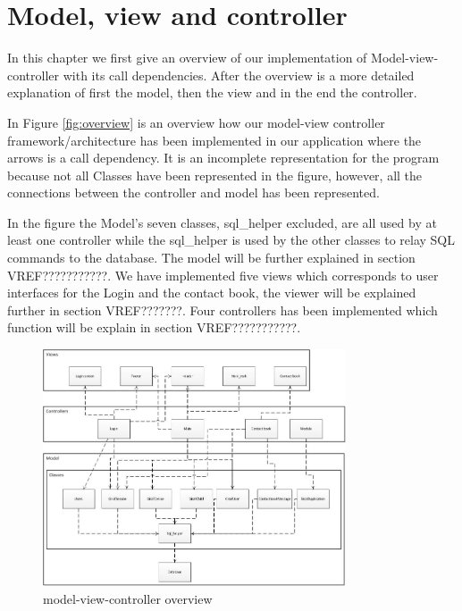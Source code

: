 \chapter{Model, view and controller}
In this chapter we first give an overview of our implementation of Model-view-controller with its call dependencies. After the overview is a more detailed explanation of first the model, then the view and in the end the controller.  

In Figure \vref{fig:overview} is an overview how our model-view controller framework/architecture has been implemented in our application where the arrows is a call dependency. It is an incomplete representation for the program because not all Classes have been represented in the figure, however, all the connections between the controller and model has been represented. 

In the figure the Model's seven classes, sql\_helper excluded, are all used by at least one controller while the sql\_helper is used by the other classes to relay SQL commands to the database. The model will be further explained in section VREF{???????????}. We have implemented five views which corresponds to user interfaces for the Login and the contact book, the viewer will be explained further in section VREF{???????}. Four controllers has been implemented which function will be explain in section VREF{???????????}.

\begin{figure}[ht]
	\centering
		\includegraphics[width=0.80\textwidth]{img/overview.jpg}
	\caption{model-view-controller overview}
	\label{fig:overview}
\end{figure}
